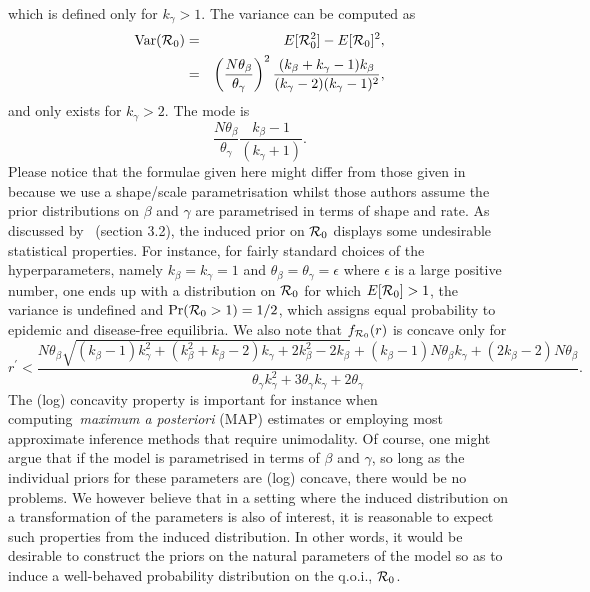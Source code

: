 \documentclass[alpha-refs]{wiley-article}
\newcommand{\rr}{ {\cal R}_0 }						%
\begin{document}
which is defined only for $k_{\gamma} > 1$.
The variance can be computed as
\begin{eqnarray}
\nonumber
\text{Var}(\rr) &=& E[\rr^2] - E[\rr]^2,  \\
\label{eq:var}
 &=& \left(\frac{N\theta_{\beta}}{\theta_{\gamma}}\right)^2\frac{(k_{\beta}+k_{\gamma}-1)k_{\beta}}{(k_{\gamma}-2)(k_{\gamma}-1)^2},
\end{eqnarray}
and only exists for $k_{\gamma} > 2$.
The mode is 
\begin{equation}
\label{eq:mode}
\frac{N\theta_{\beta}}{\theta_{\gamma}}\frac{k_{\beta} - 1}{(k_{\gamma} + 1)}.
\end{equation}
Please notice that the formulae given here might differ from those given in~\cite{Clancy2008} because we use a shape/scale parametrisation whilst those authors assume the prior distributions on $\beta$ and $\gamma$ are parametrised in terms of shape and rate.
As discussed by~\cite{Clancy2008} (section 3.2), the induced prior on $\rr$ displays some undesirable statistical properties.
For instance, for fairly standard choices of the hyperparameters, namely $k_\beta = k_\gamma = 1$ and $\theta_\beta = \theta_\gamma = \epsilon$ where $\epsilon$ is a large positive number, one ends up with a distribution on $\rr$ for which $E[\rr] > 1$, the variance is undefined and $\text{Pr}(\rr > 1) = 1/2$, which assigns equal probability to epidemic and disease-free equilibria.
We also note that $f_{\rr}(r)$ is concave only for %
\begin{equation}
\label{eq:logconcavity}
r^\prime < \dfrac{N\theta_\beta \sqrt{\left(k_{\beta}-1\right)k_{\gamma}^2+\left(k_{\beta}^2+k_{\beta}-2\right)k_{\gamma}+2k_{\beta}^2-2k_{\beta}}+\left(k_{\beta}-1\right)N\theta_\beta k_{\gamma}+\left(2k_{\beta}-2\right)N\theta_\beta}{\theta_{\gamma} k_{\gamma}^2+3\theta_{\gamma} k_{\gamma}+2\theta_{\gamma}}.
\end{equation}
The (log) concavity property is important for instance when computing~\textit{maximum a posteriori} (MAP) estimates or employing most approximate inference methods that require unimodality.
Of course, one might argue that if the model is parametrised in terms of $\beta$ and $\gamma$, so long as the individual priors for these parameters are (log) concave, there would be no problems.
We however believe that in a setting where the induced distribution on a transformation of the parameters is also of interest, it is reasonable to expect such properties from the induced distribution.
In other words, it would be desirable to construct the priors on the natural parameters of the model so as to induce a well-behaved probability distribution on the q.o.i., $\rr$.
\end{document}
